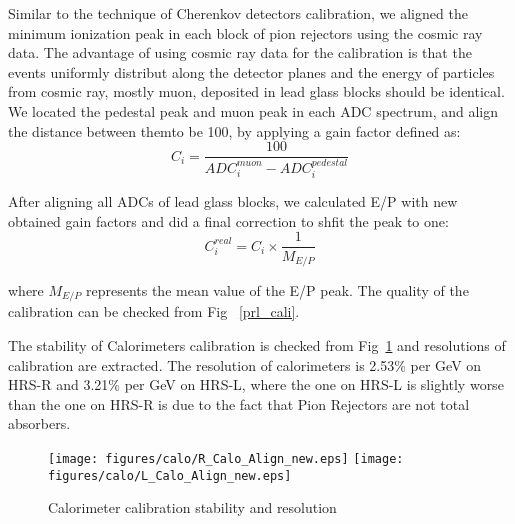  Similar to the technique of Cherenkov detectors calibration, we aligned the minimum ionization peak in each block of pion rejectors using the cosmic ray data. The advantage of using cosmic ray data for the calibration is that the events uniformly distribut along the detector planes and the energy of particles from cosmic ray, mostly muon, deposited in lead glass blocks should be identical. We located the pedestal peak and muon peak in each ADC spectrum, and align the distance between themto be 100, by applying a gain factor defined as:
\begin{equation}
 C_{i} = \frac{100}{ADC_{i}^{muon}-ADC_{i}^{pedestal}}
\end{equation}

After aligning all ADCs of lead glass blocks, we calculated E/P with new obtained gain factors and did a final correction to shfit the peak to one:
\begin{equation}
 C_{i}^{real} = C_{i} \times \frac{1}{M_{E/P}}
\end{equation}

where $M_{E/P}$ represents the mean value of the E/P peak. The quality of the calibration can be checked from Fig ~\ref{prl_cali}.

 The stability of Calorimeters calibration is checked from Fig~\ref{calo_stability} and resolutions of calibration are extracted. The resolution of calorimeters is 2.53\% per GeV on HRS-R and 3.21\% per GeV on HRS-L, where the one on HRS-L is slightly worse than the one on HRS-R is due to the fact that Pion Rejectors are not total absorbers.

\begin{figure}[ht]
  \texttt{[image: figures/calo/R\_Calo\_Align\_new.eps]}
  \hfill
  \texttt{[image: figures/calo/L\_Calo\_Align\_new.eps]}
  \caption{\footnotesize{Calorimeter calibration stability and resolution}}
  \label{calo_stability}
\end{figure}
